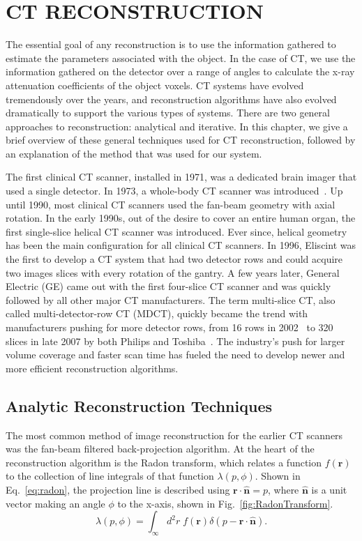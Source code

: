 \chapter{CT RECONSTRUCTION}
\label{chap:reconstruction}

The essential goal of any reconstruction is to use the information gathered to estimate the parameters associated with the object.  In the case of CT, we use the information gathered on the detector over a range of angles to calculate the x-ray attenuation coefficients of the object voxels.  CT systems have evolved tremendously over the years, and reconstruction algorithms have also evolved dramatically to support the various types of systems. There are two general approaches to reconstruction: analytical and iterative.  In this chapter, we give a brief overview of these general techniques used for CT reconstruction, followed by an explanation of the method that was used for our system.

The first clinical CT scanner, installed in 1971, was a dedicated brain imager that used a single detector.  In 1973, a whole-body CT scanner was introduced~\citep{Ulzheimer2009}.  Up until 1990, most clinical CT scanners used the fan-beam geometry with axial rotation.  In the early 1990s, out of the desire to cover an entire human organ, the first single-slice helical CT scanner was introduced.  Ever since, helical geometry has been the main configuration for all clinical CT scanners.  In 1996, Eliscint was the first to develop a CT system that had two detector rows and could acquire two images slices with every rotation of the gantry.  A few years later, General Electric (GE) came out with the first four-slice CT scanner and was quickly followed by all other major CT manufacturers.  The term multi-slice CT, also called multi-detector-row CT (MDCT), quickly became the trend with manufacturers pushing for more detector rows, from 16 rows in 2002~\citep{Impact2002} to 320 slices in late 2007 by both Philips and Toshiba~\citep{Ulzheimer2009}.  The industry's push for larger volume coverage and faster scan time has fueled the need to develop newer and more efficient reconstruction algorithms.

\section{Analytic Reconstruction Techniques}

The most common method of image reconstruction for the earlier CT scanners was the fan-beam filtered back-projection algorithm.  At the heart of the reconstruction algorithm is the Radon transform, which relates a function $f(\mathbf{r})$ to the collection of line integrals of that function $\lambda(p, \phi)$.  Shown in Eq.~\ref{eq:radon}, the projection line is described using $\mathbf{r \cdot \hat{n}} = p$, where $\mathbf{\hat{n}}$ is a unit vector making an angle $\phi$ to the x-axis, shown in Fig.~\ref{fig:RadonTransform}.  
%
\begin{equation}
\lambda(p, \phi) = \int_\infty d^2r \; f(\mathbf{r}) \delta(p- \mathbf{r} \cdot \mathbf{\hat{n}}).
\label{eq:radon}
\end{equation}


